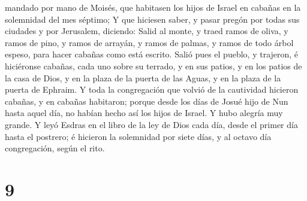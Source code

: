 mandado por mano de Moisés, que habitasen los hijos de Israel en cabañas
en la solemnidad del mes séptimo;  Y que hiciesen saber, y
pasar pregón por todas sus ciudades y por Jerusalem, diciendo: Salid al
monte, y traed ramos de oliva, y ramos de pino, y ramos de arrayán, y
ramos de palmas, y ramos de todo árbol espeso, para hacer cabañas como
está escrito.  Salió pues el pueblo, y trajeron, é
hiciéronse cabañas, cada uno sobre su terrado, y en sus patios, y en los
patios de la casa de Dios, y en la plaza de la puerta de las Aguas, y en
la plaza de la puerta de Ephraim.  Y toda la congregación
que volvió de la cautividad hicieron cabañas, y en cabañas habitaron;
porque desde los días de Josué hijo de Nun hasta aquel día, no habían
hecho así los hijos de Israel. Y hubo alegría muy grande. 
Y leyó Esdras en el libro de la ley de Dios cada día, desde el primer
día hasta el postrero; é hicieron la solemnidad por siete días, y al
octavo día congregación, según el rito.

\hypertarget{section-8}{%
\section{9}\label{section-8}}

